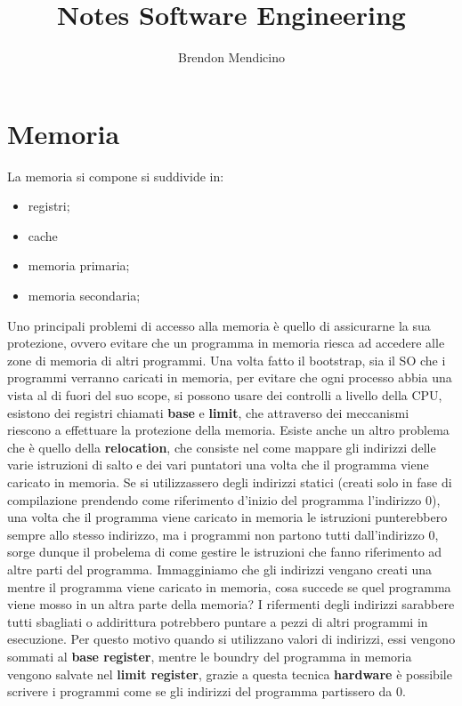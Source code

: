 \documentclass[12pt]{article}
\title{Notes Software Engineering}
\author{Brendon Mendicino}
\begin{document}
\maketitle
\newpage
\tableofcontents




\newpage
\section{Memoria}
La memoria si compone si suddivide in:
\begin{itemize}
  \item registri;
  \item cache
  \item memoria primaria;
  \item memoria secondaria;
\end{itemize}
Uno principali problemi di accesso alla memoria \`e quello di assicurarne la sua protezione, ovvero evitare che un programma in memoria riesca ad accedere alle zone di memoria di altri programmi. Una volta fatto il bootstrap, sia il SO che i programmi verranno caricati in memoria, per evitare che ogni processo abbia una vista al di fuori del suo scope, si possono usare dei controlli a livello della CPU, esistono dei registri chiamati \textbf{base} e \textbf{limit}, che attraverso dei meccanismi riescono a effettuare la protezione della memoria. Esiste anche un altro problema che \`e quello della \textbf{relocation}, che consiste nel come mappare gli indirizzi delle varie istruzioni di salto e dei vari puntatori una volta che il programma viene caricato in memoria. Se si utilizzassero degli indirizzi statici (creati solo in fase di compilazione prendendo come riferimento d'inizio del programma l'indirizzo $0$), una volta che il programma viene caricato in memoria le istruzioni punterebbero sempre allo stesso indirizzo, ma i programmi non partono tutti dall'indirizzo $0$, sorge dunque il probelema di come gestire le istruzioni che fanno riferimento ad altre parti del programma. Immagginiamo che gli indirizzi vengano creati una mentre il programma viene caricato in memoria, cosa succede se quel programma viene mosso in un altra parte della memoria? I rifermenti degli indirizzi sarabbere tutti sbagliati o addirittura potrebbero puntare a pezzi di altri programmi in esecuzione. Per questo motivo quando si utilizzano valori di indirizzi, essi vengono sommati al \textbf{base register}, mentre le boundry del programma in memoria vengono salvate nel \textbf{limit register}, grazie a questa tecnica \textbf{hardware} \`e possibile scrivere i programmi come se gli indirizzi del programma partissero da $0$.
\end{document}
